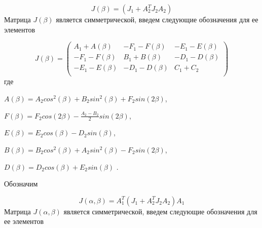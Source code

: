 \begin{equation} %
\label{eq:p3:21}
J \left( \beta \right) = \left( J_{1}+A_{2}^{T}J_{2}A_{2} \right) 
\end{equation}
Матрица \( J \left( \beta \right) \) является симметрической, введем следующие обозначения для ее элементов 


\begin{equation} %
\label{eq:p3:22}
J \left( \beta \right) = \left( \begin{matrix}
A_{1}+A \left( \beta \right) & -F_{1}-F \left( \beta \right) & -E_{1}-E \left( \beta \right) \\
-F_{1}-F \left( \beta \right) & B_{1}+B \left( \beta \right) & -D_{1}-D \left( \beta \right) \\
-E_{1}-E \left( \beta \right) & -D_{1}-D \left( \beta \right) & C_{1}+C_{2}\\
\end{matrix}
\right) 
\end{equation}
где 

\( A \left( \beta \right) =A_{2}cos^{2} \left( \beta \right) +B_{2}sin^{2} \left( \beta \right) +F_{2}sin \left( 2 \beta \right) \), 

\( F \left( \beta \right) =F_{2}cos \left( 2 \beta \right) -\frac{A_{2}-B_{2}}{2}sin \left( 2 \beta \right) \), 

\( E \left( \beta \right) =E_{2}cos \left( \beta \right) -D_{2}sin \left( \beta \right) \), 

\( B \left( \beta \right) =B_{2}cos^{2} \left( \beta \right) +A_{2}sin^{2} \left( \beta \right) -F_{2}sin \left( 2 \beta \right) \), 

\( D \left( \beta \right) =D_{2}cos \left( \beta \right) +E_{2}sin \left( \beta \right) \) . 

Обозначим 

\begin{equation} %
\label{eq:p3:23}
J \left( \alpha, \beta \right) =A_{1}^{T} \left( J_{1}+A_{2}^{T}J_{2}A_{2} \right) A_{1}
\end{equation}
Матрица \( J \left( \alpha, \beta \right) \) является симметрической, введем следующие обозначения для ее элементов 


